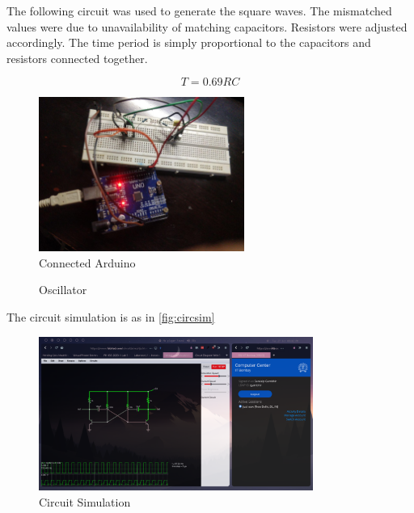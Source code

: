 
The following circuit was used to generate the square waves. The mismatched
values were due to unavailability of matching capacitors. Resistors were
adjusted accordingly. The time period is simply proportional to the capacitors
and resistors connected together.

\begin{equation}
  T = 0.69 RC
\end{equation}

\begin{figure}[ht]
    \centering
    \includegraphics[width=0.6\textwidth]{fig/arduinoconnected-min.jpg}
    \caption{Connected Arduino}
    \label{fig:conn}
\end{figure}

\begin{figure}[ht]
    \centering
    \scalebox{0.5}{}
    \caption{Oscillator}
    \label{fig:oscillator}
\end{figure}

The circuit simulation is as in \autoref{fig:circsim}

\begin{figure}[ht]
    \centering
    \includegraphics[width=0.8\textwidth]{fig/sim.png}
    \caption{Circuit Simulation}
    \label{fig:circsim}
\end{figure}


